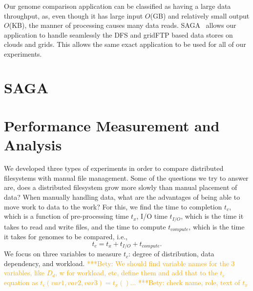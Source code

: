 \documentclass{rspublic}
\newcommand{\micnote}[1]{ {\textcolor{blue} { ***Michael: #1 }}}
\newcommand{\betynote}[1]{ {\textcolor{orange} { ***Bety: #1 }}}
\newcommand{\jhanote}[1]{} \newcommand{\micnote}[1]{}\newcommand{\betynote}[1]{} \newcommand{\fixme}[1]{}
\begin{document}

Our genome comparison application can be classified as having a large
data throughput, as, even though it has large input $O$(GB) and
relatively small output $O$(KB), the manner of processing causes many
data reads. SAGA~\citep{saga_web} allows our application to handle
seamlessly the DFS and gridFTP based data stores on clouds and grids.
This allows the same exact application to be used for all of our
experiments. 

\section{SAGA} \label{Sec:SAGA}

\section{Performance Measurement and Analysis} We developed three types
of experiments in order to compare distributed filesystems with manual
file management. Some of the questions we try to answer are, does a
distributed filesystem grow more slowly than manual placement of data?
When manually handling data, what are the advantages of being able to
move work to data to the work? For this, we find the time to completion
$t_c$, which is a function of pre-processing time $t_x$, I/O time
$t_{I/O}$, which is the time it takes to read and write files, and the
time to compute $t_{compute}$, which is the time it takes for genomes to
be compared, i.e.,
 \begin{equation}
t_c = t_x + t_{I/O} + t_{compute}.
\end{equation}
We focus on three variables to measure $t_c$: degree of distribution, data
dependency, and workload.
\betynote{We should find variable names for the 3 variables, like $D_d$,
w for workload, etc, define them and add that to the $t_c$ equation as
$t_c(var1, var2, var3) = t_x()$...}
\betynote{check name, role, text of $t_x$}
\end{document}
